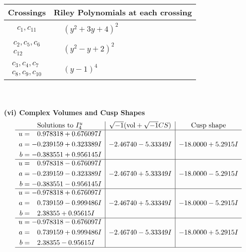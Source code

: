\documentclass[1p]{elsarticle_modified}
\theoremstyle{definition}
\newcommand{\I}{\sqrt{-1}}
\begin{document}
\begin{tabular}{m{50pt}|m{274pt}}
Crossings & \hspace{64pt}Riley Polynomials at each crossing \\
\hline $$\begin{aligned}c_{1},c_{11}\end{aligned}$$&$\begin{aligned}
&(y^2+3 y+4)^2
\end{aligned}$\\
\hline $$\begin{aligned}c_{2},c_{5},c_{6}\\c_{12}\end{aligned}$$&$\begin{aligned}
&(y^2- y+2)^2
\end{aligned}$\\
\hline $$\begin{aligned}c_{3},c_{4},c_{7}\\c_{8},c_{9},c_{10}\end{aligned}$$&$\begin{aligned}
&(y-1)^4
\end{aligned}$\\
\hline
\end{tabular}\\~\\
\newpage\flushleft \textbf{(vi) Complex Volumes and Cusp Shapes}
$$\begin{array}{c|c|c}  
\text{Solutions to }I^u_{4}& \I (\text{vol} + \sqrt{-1}CS) & \text{Cusp shape}\\
 \hline 
\begin{aligned}
u &= \phantom{-}0.978318 + 0.676097 I \\
a &= -0.239159 + 0.323389 I \\
b &= -0.383551 + 0.956145 I\end{aligned}
 & -2.46740 - 5.33349 I & -18.0000 + 5.2915 I \\ \hline\begin{aligned}
u &= \phantom{-}0.978318 - 0.676097 I \\
a &= -0.239159 - 0.323389 I \\
b &= -0.383551 - 0.956145 I\end{aligned}
 & -2.46740 + 5.33349 I & -18.0000 - 5.2915 I \\ \hline\begin{aligned}
u &= -0.978318 + 0.676097 I \\
a &= \phantom{-}0.739159 - 0.999486 I \\
b &= \phantom{-}2.38355 + 0.95615 I\end{aligned}
 & -2.46740 + 5.33349 I & -18.0000 - 5.2915 I \\ \hline\begin{aligned}
u &= -0.978318 - 0.676097 I \\
a &= \phantom{-}0.739159 + 0.999486 I \\
b &= \phantom{-}2.38355 - 0.95615 I\end{aligned}
 & -2.46740 - 5.33349 I & -18.0000 + 5.2915 I\\
 \hline 
 \end{array}$$\newpage\newpage\renewcommand{\arraystretch}{1}
\end{document}
